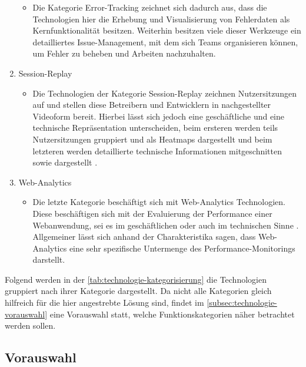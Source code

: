 \begin{enumerate}
\begin{itemize}
		\item Die Kategorie Error-Tracking zeichnet sich dadurch aus, dass die Technologien hier die Erhebung und Visualisierung von Fehlerdaten als Kernfunktionalität besitzen. Weiterhin besitzen viele dieser Werkzeuge ein detailliertes Issue-Management, mit dem sich Teams organisieren können, um Fehler zu beheben und Arbeiten nachzuhalten.
	\end{itemize}
	\item Session-Replay
	\begin{itemize}
		\item Die Technologien der Kategorie Session-Replay zeichnen Nutzersitzungen auf und stellen diese Betreibern und Entwicklern in nachgestellter Videoform bereit. Hierbei lässt sich jedoch eine geschäftliche und eine technische Repräsentation unterscheiden, beim ersteren werden teils Nutzersitzungen gruppiert und als Heatmaps dargestellt und beim letzteren werden detaillierte technische Informationen mitgeschnitten sowie dargestellt \cite{Webalyt}.
	\end{itemize}
	\item Web-Analytics
	\begin{itemize}
		\item Die letzte Kategorie beschäftigt sich mit Web-Analytics Technologien. Diese beschäftigen sich mit der Evaluierung der Performance einer Webanwendung, sei es im geschäftlichen oder auch im technischen Sinne \cite{APracticalEvaluationOfWebAnalytics} \cite{WebAnalyticsAnHourADay}. Allgemeiner lässt sich anhand der Charakteristika sagen, dass Web-Analytics eine sehr spezifische Untermenge des Performance-Monitorings darstellt.
	\end{itemize}
\end{enumerate}

Folgend werden in der \autoref{tab:technologie-kategorisierung} die Technologien gruppiert nach ihrer Kategorie dargestellt. Da nicht alle Kategorien gleich hilfreich für die hier angestrebte Lösung sind, findet im \autoref{subsec:technologie-vorauswahl} eine Vorauswahl statt, welche Funktionskategorien näher betrachtet werden sollen.



\subsection{Vorauswahl}
\label{subsec:technologie-vorauswahl}

